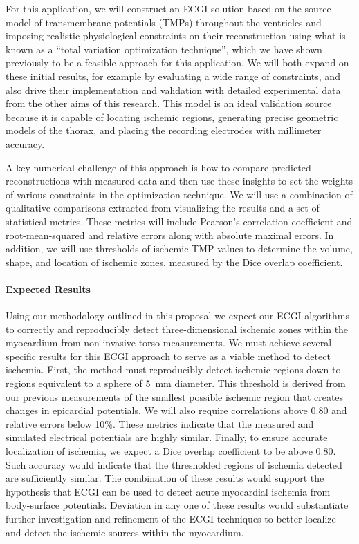 For this application, we will construct an ECGI solution based on the
source model of transmembrane potentials (TMPs) throughout the ventricles
and imposing realistic physiological constraints on their reconstruction
using what is known as a ``total variation optimization technique'', which
we have shown previously to be a feasible approach for this
application. \cite{RSM:Wan2011b,RSM:Wan2013} We will both expand on these
initial results, for example by evaluating a wide range of constraints, and
also drive their implementation and validation with detailed experimental
data from the other aims of this research. This model is an ideal
validation source because it is capable of locating ischemic regions,
generating precise geometric models of the thorax, and placing the
recording electrodes with millimeter accuracy. 

A key numerical challenge of this approach is how to compare predicted
reconstructions with measured data and then use these insights to set the
weights of various constraints in the optimization technique.  We will use
a combination of qualitative comparisons extracted from visualizing the
results and a set of statistical metrics. These metrics will include
Pearson's correlation coefficient and root-mean-squared and relative errors
along with absolute maximal errors.  In addition, we will use thresholds of
ischemic TMP values to determine the volume, shape, and location of
ischemic zones, measured by the Dice overlap coefficient.


\paragraph{Expected Results} Using our methodology outlined in this proposal we expect our ECGI algorithms to correctly and reproducibly detect three-dimensional ischemic zones within the myocardium from non-invasive torso measurements. We must achieve several specific results for
this ECGI approach to serve as a viable method to detect ischemia. First,
the method must reproducibly detect ischemic regions down to regions
equivalent to a sphere of 5~mm diameter. This threshold is derived from our
previous measurements of the smallest possible ischemic region that creates
changes in epicardial potentials.  We will also require correlations above
0.80 and relative errors below 10\%. These metrics indicate that the
measured and simulated electrical potentials are highly similar. Finally,
to ensure accurate localization of ischemia, we expect a Dice overlap
coefficient to be above 0.80. Such accuracy would indicate that the
thresholded regions of ischemia detected are sufficiently similar. The
combination of these results would support the hypothesis that ECGI can be
used to detect acute myocardial ischemia from body-surface
potentials. Deviation in any one of these results would substantiate
further investigation and refinement of the ECGI techniques to better
localize and detect the ischemic sources within the myocardium.

